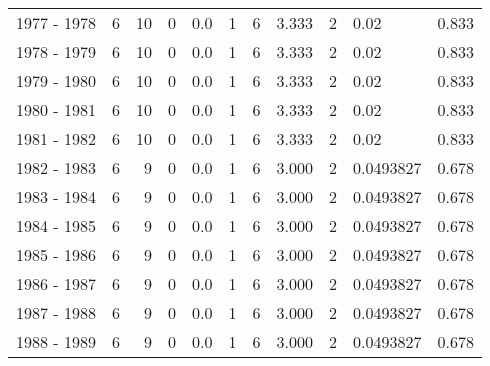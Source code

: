 \begin{tabular}{lrrrrrrrllr}
1977 - 1978 &        6 &       10 &                 0 &               0.0 &                       1 &                          6 &       3.333 &             2 &       0.02 &             0.833 \\
1978 - 1979 &        6 &       10 &                 0 &               0.0 &                       1 &                          6 &       3.333 &             2 &       0.02 &             0.833 \\
1979 - 1980 &        6 &       10 &                 0 &               0.0 &                       1 &                          6 &       3.333 &             2 &       0.02 &             0.833 \\
1980 - 1981 &        6 &       10 &                 0 &               0.0 &                       1 &                          6 &       3.333 &             2 &       0.02 &             0.833 \\
1981 - 1982 &        6 &       10 &                 0 &               0.0 &                       1 &                          6 &       3.333 &             2 &       0.02 &             0.833 \\
1982 - 1983 &        6 &        9 &                 0 &               0.0 &                       1 &                          6 &       3.000 &             2 &  0.0493827 &             0.678 \\
1983 - 1984 &        6 &        9 &                 0 &               0.0 &                       1 &                          6 &       3.000 &             2 &  0.0493827 &             0.678 \\
1984 - 1985 &        6 &        9 &                 0 &               0.0 &                       1 &                          6 &       3.000 &             2 &  0.0493827 &             0.678 \\
1985 - 1986 &        6 &        9 &                 0 &               0.0 &                       1 &                          6 &       3.000 &             2 &  0.0493827 &             0.678 \\
1986 - 1987 &        6 &        9 &                 0 &               0.0 &                       1 &                          6 &       3.000 &             2 &  0.0493827 &             0.678 \\
1987 - 1988 &        6 &        9 &                 0 &               0.0 &                       1 &                          6 &       3.000 &             2 &  0.0493827 &             0.678 \\
1988 - 1989 &        6 &        9 &                 0 &               0.0 &                       1 &                          6 &       3.000 &             2 &  0.0493827 &             0.678 \\

\end{tabular}
